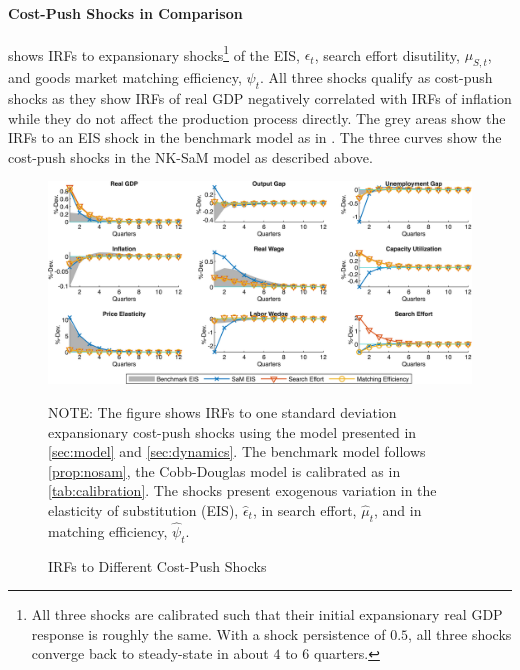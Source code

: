 \documentclass[12pt,3p,authoryear,review]{elsarticle}
\begin{document}
\paragraph{Cost-Push Shocks in Comparison}%
 shows IRFs to expansionary shocks\footnote{All three shocks are calibrated such that their initial expansionary real GDP response is roughly the same. With a shock persistence of $0.5$, all three shocks converge back to steady-state in about $4$ to $6$ quarters.} of the EIS, $\epsilon_t$, search effort disutility, $\mu_{S,t}$, and goods market matching efficiency, $\psi_t$. All three shocks qualify as cost-push shocks as they show IRFs of real GDP negatively correlated with IRFs of inflation while they do not affect the production process directly. The grey areas show the IRFs to an EIS shock in the benchmark model as in \cite{ireland_technology_2004}. The three curves show the cost-push shocks in the NK-SaM model as described above.\\%
\begin{figure}[t]%
	\centering%
	\caption{IRFs to Different Cost-Push Shocks}\label{fig:cost-push_comparison}%
	\vspace{-0.1in}%
	\includegraphics[width=\textwidth]{fig_6_irf_comparison_cost-push.png}%
	\vspace{-0.1in}%
	{\tiny \singlespacing NOTE: The figure shows IRFs to one standard deviation expansionary cost-push shocks using the model presented in \cref{sec:model} and \cref{sec:dynamics}. The benchmark model follows \cref{prop:nosam}, the Cobb-Douglas model is calibrated as in \cref{tab:calibration}. The shocks present exogenous variation in the elasticity of substitution (EIS), $\hat{\epsilon}_t$, in search effort, $\hat{\mu}_t$, and in matching efficiency, $\hat{\psi}_t$.\par}%
\end{figure}%
\end{document}
